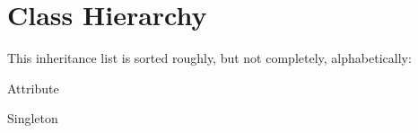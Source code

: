 \section{Class Hierarchy}
This inheritance list is sorted roughly, but not completely, alphabetically\+:\begin{DoxyCompactList}
\item Attribute\begin{DoxyCompactList}
\item {}
\end{DoxyCompactList}
\item Singleton\begin{DoxyCompactList}
\item {}
\end{DoxyCompactList}
\end{DoxyCompactList}
